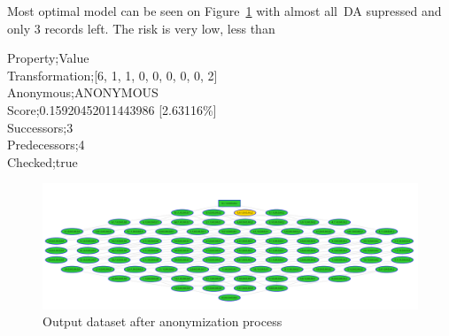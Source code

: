 Most optimal model can be seen on Figure~\ref{fig:my_label7} with almost all~\ac{DA} supressed and only 3 records left. The risk is very
low, less than %

Property;Value\\
Transformation;[6, 1, 1, 0, 0, 0, 0, 0, 2]\\
Anonymous;ANONYMOUS\\
Score;0.15920452011443986 [2.63116\%]\\
Successors;3\\
Predecessors;4\\
Checked;true\\


\begin{figure}[ht]
  \smaller
  \centering
  \includegraphics[width=\textwidth, keepaspectratio]{assets/model}
  \caption{Output dataset after anonymization process}
  \label{fig:my_label7}
\end{figure}
